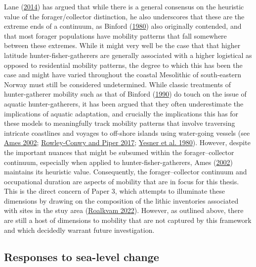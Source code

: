 \documentclass[
  12pt,
  a4paper,
  oneside]{book}
\begin{document}
Lane (\protect\hyperlink{ref-lane2014}{2014}) has argued that while there is a general consensus on the heuristic value of the forager/collector distinction, he also underscores that these are the extreme ends of a continuum, as Binford (\protect\hyperlink{ref-binford1980}{1980}) also originally contended, and that most forager populations have mobility patterns that fall somewhere between these extremes. While it might very well be the case that that higher latitude hunter-fisher-gatherers are generally associated with a higher logistical as opposed to residential mobility patterns, the degree to which this has been the case and might have varied throughout the coastal Mesolithic of south-eastern Norway must still be considered undetermined. While classic treatments of hunter-gatherer mobility such as that of Binford (\protect\hyperlink{ref-binford1990}{1990}) do touch on the issue of aquatic hunter-gatherers, it has been argued that they often underestimate the implications of aquatic adaptation, and crucially the implications this has for these models to meaningfully track mobility patterns that involve traversing intricate coastlines and voyages to off-shore islands using water-going vessels (see \protect\hyperlink{ref-ames2002}{Ames 2002}; \protect\hyperlink{ref-rowley-conwy2017}{Rowley-Conwy and Piper 2017}; \protect\hyperlink{ref-yesner1980}{Yesner et al. 1980}). However, despite the important nuances that might be subsumed within the forager--collector continuum, especially when applied to hunter-fisher-gatherers, Ames (\protect\hyperlink{ref-ames2002}{2002}) maintains its heuristic value. Consequently, the forager--collector continuum and occupational duration are aspects of mobility that are in focus for this thesis. This is the direct concern of Paper 3, which attempts to illuminate these dimensions by drawing on the composition of the lithic inventories associated with sites in the stuy area (\protect\hyperlink{ref-roalkvam2022}{Roalkvam 2022}). However, as outlined above, there are still a host of dimensions to mobility that are not captured by this framework and which decidedly warrant future investigation.

\hypertarget{responses-to-sea-level-change}{%
\subsection{Responses to sea-level change}\label{responses-to-sea-level-change}}
\end{document}
